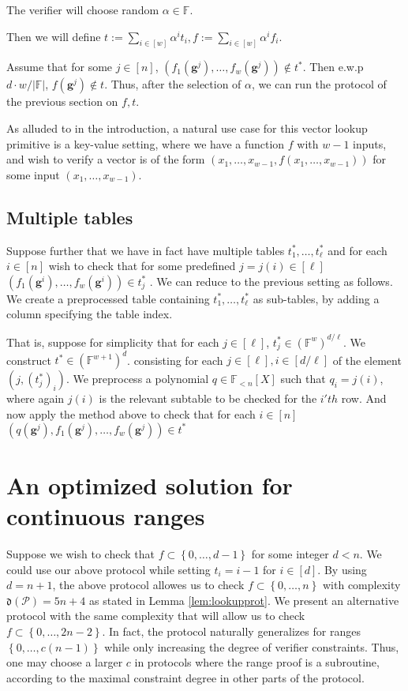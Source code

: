 \documentclass[11pt]{article} %
\newcommand{\F}{\ensuremath{\mathbb F}\xspace}
\newcommand{\defeq}{:=}
\newcommand{\set}[1]{\ensuremath{\left\{#1\right\}}\xspace}
\newcommand{\hgen}{\ensuremath{\mathbf{g}}\xspace}
\newcommand{\polysofdeg}[1]{\ensuremath{\F_{< #1}[X]}\xspace}
\newcommand{\prot}{\ensuremath{\mathscr{P}}\xspace}
\newcommand{\aggdeg}[1]{\ensuremath{\mathfrak{d}(#1)}\xspace}
\begin{document}
The verifier will choose random $\alpha \in \F$.

Then we will define $t\defeq \sum_{i\in [w]} \alpha^i t_i, f \defeq \sum_{i\in [w]} \alpha^i f_i$.

Assume that for some $j\in [n]$, $(f_1(\hgen^j),\ldots,f_w(\hgen^j))\notin t^*$.
Then e.w.p $d\cdot w/|\F|$, $f(\hgen^j)\notin t$.
Thus, after the selection of $\alpha$,
we can run the protocol of the previous section on $f,t$.

As alluded to in the introduction, a natural use case for this vector lookup primitive is a key-value setting, where we have a function $f$ with $w-1$ inputs,
and wish to verify a vector is of the form $(x_1,\ldots,x_{w-1},f(x_1,\ldots,x_{w-1}))$ for some input $(x_1,\ldots,x_{w-1})$.

\subsection{Multiple tables}
Suppose further that we have in fact have multiple tables $t^*_1,\ldots, t^*_\ell$
and for each $i\in [n]$ wish to check that for some predefined $j=j(i)\in [\ell]$  $(f_1(\hgen^i),\ldots,f_w(\hgen^i))\in t^*_j$ .
We can reduce to the previous setting as follows.
We create a preprocessed table containing $t^*_1,\ldots, t^*_\ell$ as sub-tables, by adding a column specifying the table index.

That is, suppose for simplicity that for each $j\in [\ell]$, $t^*_j\in (\F^{w})^{d/\ell}$.
We construct $t^*\in (\F^{w+1})^d$.
consisting for each $j\in [\ell], i\in [d/\ell]$ of the element
$(j,(t^*_j)_i)$.
We preprocess a polynomial $q\in \polysofdeg{n}$
such that $q_i =j(i)$, where again $j(i)$ is the relevant subtable to be checked for the $i'th$ row.
And now apply the method above to check that for each $i\in [n]$
$(q(\hgen^j),f_1(\hgen^j),\ldots,f_w(\hgen^j))\in t^*$

\section{An optimized solution for continuous ranges}\label{sec:ranges}
Suppose we wish to check that $f \subset \set{0,\ldots,d-1}$ for some integer $d< n$.
We could use our above protocol while setting $t_i = i-1$ for $i\in [d]$.
By using $d=n+1$, the above protocol allowes us to check $f\subset \set{0,\ldots,n}$ with complexity $\aggdeg{\prot}=5n+4$ as stated in Lemma \ref{lem:lookupprot}. 
We present an alternative protocol with the same complexity that will allow us to check $f\subset \set{0,\ldots,2n-2}$.
In fact, the protocol naturally generalizes for ranges $\set{0,\ldots,c(n-1)}$ while only increasing the degree of verifier constraints. Thus, one may choose a larger $c$ in protocols where the range proof is a subroutine, according to the maximal constraint degree in other parts of the protocol.
\end{document}
